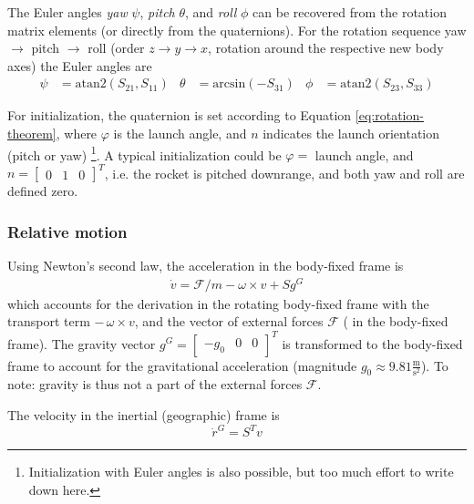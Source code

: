 The Euler angles \textit{yaw} $\psi$, \textit{pitch} $\theta$, and \textit{roll} $\phi$ can be recovered from the rotation matrix elements (or directly from the quaternions). 
For the rotation sequence yaw $\to$ pitch $\to$ roll (order $z\to y \to x$, rotation around the respective new body axes) the Euler angles are 
\begin{align}
    \psi &= \mathrm{atan2}(S_{21}, S_{11}) &
    \theta &= \mathrm{arcsin}(-S_{31}) &
    \phi &= \mathrm{atan2}(S_{23}, S_{33}) 
    \label{eq:quaternion2euler}
\end{align}

For initialization, the quaternion is set according to Equation \ref{eq:rotation-theorem}, where $\varphi$ is the launch angle, and $n$ indicates the launch orientation (pitch or yaw) \footnote{Initialization with Euler angles is also possible\cite[p. 126]{zipfel2007}, but too much effort to write down here.}.
A typical initialization could be $\varphi = $ launch angle, and $n = [\begin{smallmatrix} 0 & 1 & 0 \end{smallmatrix}]^T$, i.e. the rocket is pitched downrange, and both yaw and roll are defined zero.

\subsubsection{Relative motion}
Using Newton's second law, the acceleration in the body-fixed frame is \cite{zipfel2007, stevens2015}
\begin{align}
    \dot v = \mathcal{F}/m - \omega \times v + S g^G
    \label{eq:model-vel-deriv}
\end{align}
which accounts for the derivation in the rotating body-fixed frame with the transport term $- \, \omega \times v$, and the vector of external forces $\mathcal{F}$ ( in the body-fixed frame).
The gravity vector $g^G = \begin{bmatrix} -g_0 & 0 & 0 \end{bmatrix}^T$ is transformed to the body-fixed frame to account for the gravitational acceleration (magnitude $g_0 \approx 9.81 \frac{\mathrm{m}}{\mathrm{s}^2}$).
To note: gravity is thus not a part of the external forces $\mathcal{F}$.

The velocity in the inertial (geographic) frame is \cite{zipfel2007}
\begin{equation}
    \dot r^G = S^T v
    \label{eq:model-pos-deriv}
\end{equation}

